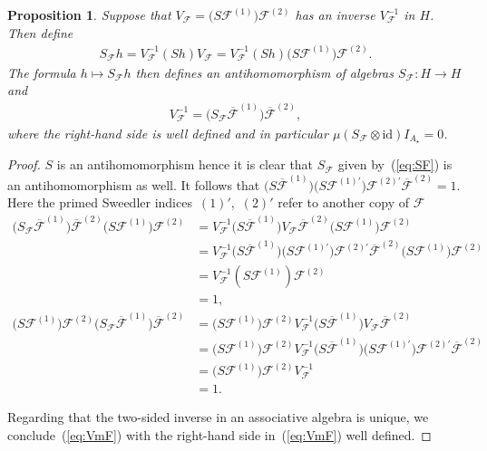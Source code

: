 \documentclass[10pt,a4paper]{amsart}
\def\id{\mathrm{id}}
\newtheorem{Proposition}[Theorem]{Proposition}
 { \theoremstyle{definition}
\newtheorem{Definition}[Theorem]{Definition}
\newtheorem{Example}[Theorem]{Example}
\newtheorem{Remark}[Theorem]{Remark} }
\numberwithin{equation}{section}
\begin{document}
\begin{Proposition}\label{prop:VFSF}
Suppose that $V_{\mathcal{F}} = \big(S\mathcal{F}^{(1)}\big)\mathcal{F}^{(2)}$ has an inverse $V^{-1}_{\mathcal{F}}$ in $H$. Then define
\begin{gather}\label{eq:SF}
S_{\mathcal{F}} h = V^{-1}_{\mathcal{F}} (S h) V_{\mathcal{F}} = V^{-1}_{\mathcal{F}} (S h) \big(S\mathcal{F}^{(1)}\big)\mathcal{F}^{(2)}.
\end{gather}
The formula $h\mapsto S_{\mathcal{F}} h$ then defines an antihomomorphism of algebras $S_{\mathcal{F}}\colon H\to H$ and
\begin{gather}\label{eq:VmF}
V^{-1}_{\mathcal{F}}= \big(S_{\mathcal{F}}\overline{\mathcal{F}}^{(1)}\big)\overline{\mathcal{F}}^{(2)},
\end{gather}
where the right-hand side is well defined and in particular $\mu(S_{\mathcal{F}}\otimes\id) I_{A_\star} = 0$.
\end{Proposition}
\begin{proof}
$S$ is an antihomomorphism hence it is clear that $S_{\mathcal{F}}$ given by~(\ref{eq:SF}) is an antihomomorphism as well. It follows that $\big(S\overline{\mathcal{F}}^{(1)}\big)\big(S\mathcal{F}^{(1)'}\big)\mathcal{F}^{(2)'}\overline{\mathcal{F}}^{(2)} = 1$. Here the primed Sweedler indi\-ces~$(1)'$,~$(2)'$ refer to another copy of $\mathcal{F}$
\begin{align*}
\big(S_{\mathcal{F}}\overline{\mathcal{F}}^{(1)}\big)\overline{\mathcal{F}}^{(2)}\big(S\mathcal{F}^{(1)}\big)\mathcal{F}^{(2)} & =
V^{-1}_{\mathcal{F}}\big(S\overline{\mathcal{F}}^{(1)}\big)V_{\mathcal{F}}\overline{\mathcal{F}}^{(2)}\big(S\mathcal{F}^{(1)}\big)\mathcal{F}^{(2)}
\\ & = V^{-1}_{\mathcal{F}}\big(S\overline{\mathcal{F}}^{(1)}\big)\big(S\mathcal{F}^{(1)'}\big)\mathcal{F}^{(2)'}\overline{\mathcal{F}}^{(2)}
\big(S\mathcal{F}^{(1)}\big)\mathcal{F}^{(2)}
\\ & = V^{-1}_{\mathcal{F}}(S\mathcal{F}^{(1)})\mathcal{F}^{(2)}
\\ & = 1,
\\
\big(S\mathcal{F}^{(1)}\big)\mathcal{F}^{(2)}\big(S_{\mathcal{F}}\overline{\mathcal{F}}^{(1)}\big)\overline{\mathcal{F}}^{(2)} & = \big(S\mathcal{F}^{(1)}\big)\mathcal{F}^{(2)}V^{-1}_{\mathcal{F}}\big(S\overline{\mathcal{F}}^{(1)}\big)V_{\mathcal{F}}\overline{\mathcal{F}}^{(2)}
\\ & = \big(S\mathcal{F}^{(1)}\big)\mathcal{F}^{(2)}V^{-1}_{\mathcal{F}}\big(S\overline{\mathcal{F}}^{(1)}\big)
\big(S\mathcal{F}^{(1)'}\big)\mathcal{F}^{(2)'}\overline{\mathcal{F}}^{(2)}
\\ & = \big(S\mathcal{F}^{(1)}\big)\mathcal{F}^{(2)}V^{-1}_{\mathcal{F}}
\\ & = 1.
\end{align*}

Regarding that the two-sided inverse in an associative algebra is unique, we conclude~(\ref{eq:VmF}) with the right-hand side in~(\ref{eq:VmF}) well defined.
\end{proof}
\end{document}
